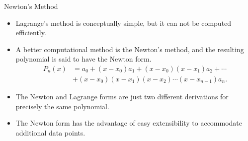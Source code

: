 \documentclass{beamer}
\begin{document}
\begin{frame}{Newton's Method}
\begin{itemize}
\item Lagrange's method is conceptually simple, but it can not be computed  efficiently.
\item A better computational method is the \alert{Newton's method}, and the resulting polynomial is said to have the \alert{Newton form}.
\begin{align*}
P_n(x)&=a_0+(x-x_0)a_1+(x-x_0)(x-x_1)a_2 + \cdots\\
&+(x-x_0)(x-x_1)(x-x_2)\cdots (x-x_{n-1})a_n. 
\end{align*}
\item  The Newton and Lagrange forms are just two different derivations for precisely the \alert{same polynomial}. 
\item The Newton form has the advantage of easy extensibility to accommodate additional data points.

\end{itemize}
\end{frame}
\end{document}
